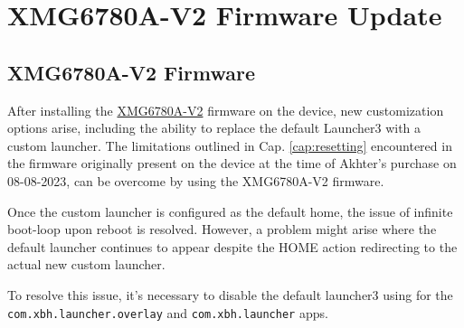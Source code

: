 {\color{teal!90}\chapter{XMG6780A-V2 Firmware Update}\label{cap:XMG6780A-V2}}


\minitoc%


\section{XMG6780A-V2 Firmware}

After installing the \href{https://www.dropbox.com/scl/fi/razk4d533kkrign0e0kd1/wetransfer_new-firmware_2023-09-04_0553.zip?rlkey=jrls1bpkyo93ul3i0t1nokexu&dl=0}{XMG6780A-V2} firmware on the device, new customization options arise, including the ability to replace the default Launcher3 with a custom launcher. The limitations outlined in Cap. \ref{cap:resetting} encountered in the firmware originally present on the device at the time of Akhter's purchase on 08-08-2023, can be overcome by using the XMG6780A-V2 firmware.

\medskip
Once the custom launcher is configured as the default home, the issue of infinite boot-loop upon reboot is resolved. However, a problem might arise where the default launcher continues to appear despite the HOME action redirecting to the actual new custom launcher.

To resolve this issue, it's necessary to disable the default launcher3 using  for the \texttt{\color{BrickRed}com.xbh.launcher.overlay} and \texttt{\color{BrickRed}com.xbh.launcher} apps.

